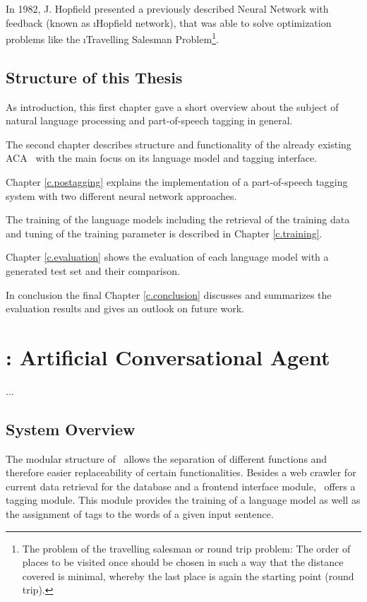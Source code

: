 In 1982, J. Hopfield presented a previously described Neural Network with feedback (known as \i{Hopfield network}), that was able to solve optimization problems like the \i{Travelling Salesman Problem}\footnote{The problem of the travelling salesman or round trip problem: The order of places to be visited once should be chosen in such a way that the distance covered is minimal, whereby the last place is again the starting point (round trip).}.


\section{Structure of this Thesis}\label{c.introduction.structure}
As introduction, this first chapter gave a short overview about the subject of natural language processing and part-of-speech tagging in general.

The second chapter describes structure and functionality of the already existing ACA \Alex\ with the main focus on its language model and tagging interface.

Chapter \ref{c.postagging} explains the implementation of a part-of-speech tagging system with two different neural network approaches.

The training of the language models including the retrieval of the training data and tuning of the training parameter is described in Chapter \ref{c.training}.

Chapter \ref{c.evaluation} shows the evaluation of each language model with a generated test set and their comparison.

In conclusion the final Chapter \ref{c.conclusion} discusses and summarizes the evaluation results and gives an outlook on future work.

\chapter{\Alex: Artificial Conversational Agent}\label{c.alex}
...

\section{System Overview}\label{c.alex.overview}

The modular structure of \Alex\ allows the separation of different functions and therefore easier replaceability of certain functionalities. Besides a web crawler for current data retrieval for the database and a frontend interface module, \Alex\ offers a tagging module. This module provides the training of a language model as well as the assignment of tags to the words of a given input sentence.

